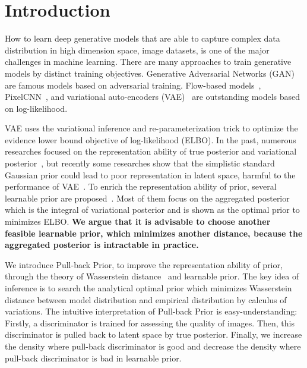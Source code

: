 \section{Introduction}

How to learn deep generative models that are able to capture complex data distribution in high dimension space, \EG image datasets, is one of the major challenges in machine learning. There are many approaches to train generative models by distinct training objectives. Generative Adversarial Networks (GAN)~\cite{goodfellow2014generative} are famous models based on adversarial training. Flow-based models~\cite{dinh2016density,kingma2018glow}, PixelCNN~\cite{van2016conditional}, and variational auto-encoders (VAE)~\cite{kingma2014auto,rezende_stochastic_2014} are outstanding models based on log-likelihood. 

VAE uses the variational inference and re-parameterization trick to optimize the evidence lower bound objective of log-likelihood (ELBO). In the past, numerous researches focused on the representation ability of true posterior and variational posterior~\cite{kingma2016improved,tomczak2016improving}, but recently some researches show that the simplistic standard Gaussian prior could lead to poor representation in latent space, harmful to the performance of VAE~\cite{tomczak2018vae}. To enrich the representation ability of prior, several learnable prior are proposed~\cite{tomczak2018vae,bauer2019resampled,takahashi2019variational}. Most of them focus on the aggregated posterior which is the integral of variational posterior and is shown as the optimal prior to minimizes ELBO. \textbf{We argue that it is advisable to choose another feasible learnable prior, which minimizes another distance, because the aggregated posterior is intractable in practice. } 

We introduce Pull-back Prior, to improve the representation ability of prior, through the theory of Wasserstein distance~\cite{arjovsky2017wasserstein} and learnable prior. The key idea of inference is to search the analytical optimal prior which minimizes Wasserstein distance between model distribution and empirical distribution by calculus of variations. 
The intuitive interpretation of Pull-back Prior is easy-understanding: Firstly, a discriminator is trained for assessing the quality of images. Then, this discriminator is pulled back to latent space by true posterior. Finally, we increase the density where pull-back discriminator is good and decrease the density where pull-back discriminator is bad in learnable prior. 

